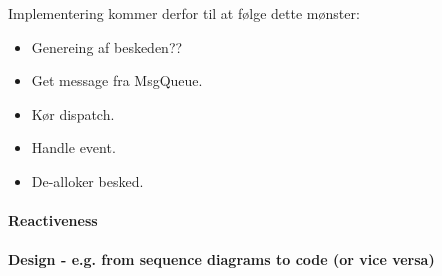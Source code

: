 Implementering kommer derfor til at følge dette mønster:

\begin{itemize}
	\item Genereing af beskeden?? 
	\item Get message fra MsgQueue.
	\item Kør dispatch.
	\item Handle event.
	\item De-alloker besked.
\end{itemize}

\paragraph{Reactiveness}

\paragraph{Design - e.g. from sequence diagrams to code (or vice versa)}
